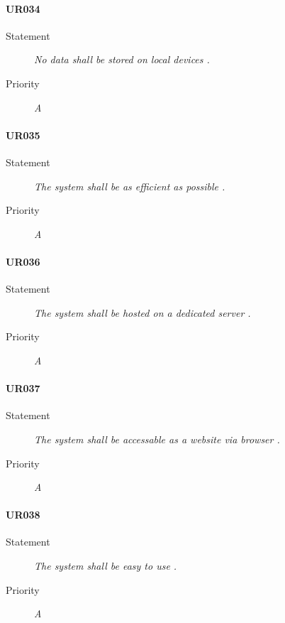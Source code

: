 \paragraph{UR034}
  \begin{description}
  \item [Statement] 
    \textit{ No data shall be stored on local devices
    .}
  \item [Priority] \textit{A}
\end{description}
    
\paragraph{UR035}
  \begin{description}
  \item [Statement] 
    \textit{ The system shall be as efficient as possible
    .}
  \item [Priority] \textit{A}
\end{description}

\paragraph{UR036}
  \begin{description}
  \item [Statement] 
    \textit{ The system shall be hosted on a dedicated server
    .}
  \item [Priority] \textit{A}
\end{description}
    
\paragraph{UR037}
  \begin{description}
  \item [Statement] 
    \textit{ The system shall be accessable as a website via browser
    .}
  \item [Priority] \textit{A}
\end{description}
    
\paragraph{UR038}
  \begin{description}
  \item [Statement] 
    \textit{ The system shall be easy to use
    .}
  \item [Priority] \textit{A}
\end{description}

